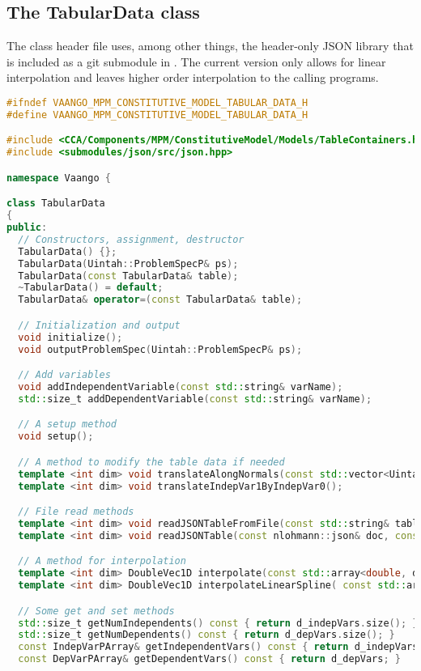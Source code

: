 \subsection{The TabularData class}
The  class header file uses, among other things, the
 header-only JSON library that is included as a git submodule
in \Vaango.  The current version only allows for linear interpolation and leaves
higher order interpolation to the calling programs.

\begin{lstlisting}[language=Cpp]
#ifndef VAANGO_MPM_CONSTITUTIVE_MODEL_TABULAR_DATA_H
#define VAANGO_MPM_CONSTITUTIVE_MODEL_TABULAR_DATA_H

#include <CCA/Components/MPM/ConstitutiveModel/Models/TableContainers.h>
#include <submodules/json/src/json.hpp>

namespace Vaango {

class TabularData
{
public:
  // Constructors, assignment, destructor
  TabularData() {};
  TabularData(Uintah::ProblemSpecP& ps);
  TabularData(const TabularData& table);
  ~TabularData() = default;
  TabularData& operator=(const TabularData& table);

  // Initialization and output
  void initialize();
  void outputProblemSpec(Uintah::ProblemSpecP& ps);

  // Add variables
  void addIndependentVariable(const std::string& varName);
  std::size_t addDependentVariable(const std::string& varName);

  // A setup method
  void setup();

  // A method to modify the table data if needed
  template <int dim> void translateAlongNormals(const std::vector<Uintah::Vector>& vec, const double& shift);
  template <int dim> void translateIndepVar1ByIndepVar0();

  // File read methods
  template <int dim> void readJSONTableFromFile(const std::string& tableFile);
  template <int dim> void readJSONTable(const nlohmann::json& doc, const std::string& tableFile);

  // A method for interpolation
  template <int dim> DoubleVec1D interpolate(const std::array<double, dim>& indepValues) const;
  template <int dim> DoubleVec1D interpolateLinearSpline( const std::array<double, dim>& indepValues, const IndepVarPArray& indepVars, const DepVarPArray& depVars) const;

  // Some get and set methods
  std::size_t getNumIndependents() const { return d_indepVars.size(); }
  std::size_t getNumDependents() const { return d_depVars.size(); }
  const IndepVarPArray& getIndependentVars() const { return d_indepVars; }
  const DepVarPArray& getDependentVars() const { return d_depVars; }


\end{lstlisting}
